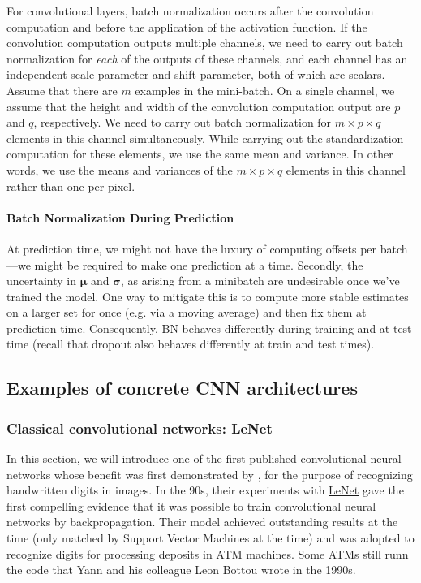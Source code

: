 For convolutional layers, batch normalization occurs after the convolution computation and before the application of the activation function. 
If the convolution computation outputs multiple channels, we need to carry out batch normalization for \textit{each} of the outputs of these channels, 
and each channel has an independent scale parameter and shift parameter, both of which are scalars. Assume that there are $m$ examples in the mini-batch. 
On a single channel, we assume that the height and width of the convolution computation output are $p$ and $q$, respectively. We need to carry out batch normalization for $m \times p \times q$ elements in this channel simultaneously. While carrying out the standardization computation for these elements, 
we use the same mean and variance. In other words, we use the means and variances of the $m \times p \times q$ elements in this channel rather than one per pixel.

\paragraph{Batch Normalization During Prediction}

At prediction time, we might not have the luxury of computing offsets per batch—we might be required to make one prediction at a time. Secondly, the uncertainty in $\mathbf{\mu}$ and $\mathbf{\sigma}$, as arising from a minibatch are undesirable once we've trained the model. One way to mitigate this is to compute more stable estimates on a larger set for once (e.g. via a moving average) and then fix them at prediction time. Consequently, BN behaves differently during training and at test time (recall that dropout also behaves differently at train and test times).

\subsection{Examples of concrete CNN architectures}

\subsubsection{Classical convolutional networks: LeNet}

In this section, we will introduce one of the first published convolutional neural networks whose benefit was first demonstrated by  \citet{Lecun1998}, for the purpose of recognizing handwritten digits in images. In the 90s, their experiments with \href{http://yann.lecun.com/exdb/lenet/}{LeNet} gave the first compelling evidence that it was possible to train convolutional neural networks by backpropagation. Their model achieved outstanding results at the time (only matched by Support Vector Machines at the time) and was adopted to recognize digits for processing deposits in ATM machines. Some ATMs still runn the code that Yann and his colleague Leon Bottou wrote in the 1990s.

